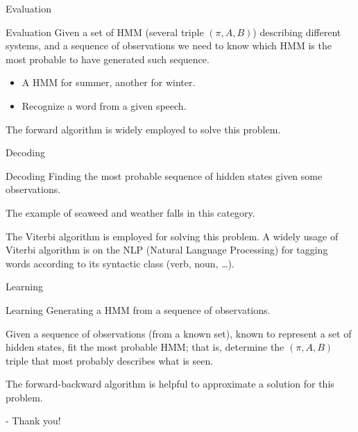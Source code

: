 \documentclass[xcolor=x11names,compress]{beamer}
\renewcommand{\(}{\begin{columns}}
\renewcommand{\)}{\end{columns}}
\newcommand{\<}[1]{\begin{column}{#1}}
\renewcommand{\>}{\end{column}}
\begin{document}
\begin{frame}{Evaluation}
\begin{block}{Evaluation}
Given a set of HMM (several triple $(\pi,A,B)$) describing different systems, and a sequence of observations we need to know which HMM is the most probable to have generated such sequence.
\begin{itemize}
	\item A HMM for summer, another for winter.
	\item Recognize a word from a given speech.
\end{itemize}

The forward algorithm is widely employed to solve this problem.
\end{block}
\end{frame}

\begin{frame}{Decoding}
\begin{block}{Decoding}
Finding the most probable sequence of hidden states given some observations.

The example of seaweed and weather falls in this category.

The Viterbi algorithm is employed for solving this problem.
A widely usage of Viterbi algorithm is on the NLP (Natural Language Processing) for tagging words according to its syntactic class (verb, noun, \ldots).
\end{block}
\end{frame}

\begin{frame}{Learning}
\begin{block}{Learning}
Generating a HMM from a sequence of observations.

Given  a sequence of observations (from a known set), known to represent a set of hidden states, fit the most probable HMM; that is, determine the $(\pi,A,B)$ triple that most probably describes what is seen.

The forward-backward algorithm is helpful to approximate a solution for this problem.
\end{block}
\end{frame}

\begin{frame}
\begin{block}{-}
Thank you!
\end{block}
\end{frame}
\end{document}
